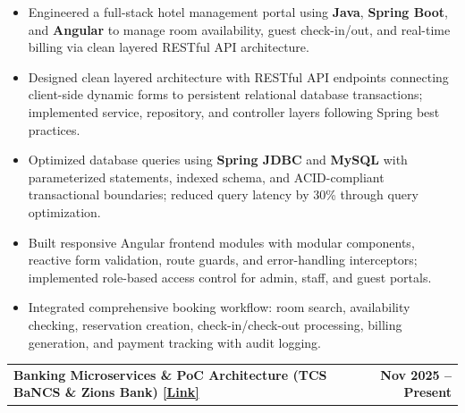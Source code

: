 \documentclass[10pt,a4paper]{article}
\makeatletter
\newcommand{\entry}[2]{%
    \noindent
    \begin{tabularx}{\linewidth}{@{}X r@{}}
        \textbf{#1} & \textbf{#2}
    \end{tabularx}
    \vspace{-2pt}
}
\makeatother
\begin{document}
\begin{itemize}

\item Engineered a full-stack hotel management portal using \textbf{Java}, \textbf{Spring Boot}, and \textbf{Angular} to manage room availability, guest check-in/out, and real-time billing via clean layered RESTful API architecture.

\item Designed clean layered architecture with RESTful API endpoints connecting client-side dynamic forms to persistent relational database transactions; implemented service, repository, and controller layers following Spring best practices.

\item Optimized database queries using \textbf{Spring JDBC} and \textbf{MySQL} with parameterized statements, indexed schema, and ACID-compliant transactional boundaries; reduced query latency by 30\% through query optimization.

\item Built responsive Angular frontend modules with modular components, reactive form validation, route guards, and error-handling interceptors; implemented role-based access control for admin, staff, and guest portals.

\item Integrated comprehensive booking workflow: room search, availability checking, reservation creation, check-in/check-out processing, billing generation, and payment tracking with audit logging.

\end{itemize}

\vspace{1pt}

\entry
{Banking Microservices \& PoC Architecture (TCS BaNCS \& Zions Bank)
\hspace{2pt}
\href{https://github.com/marideharshith21}
{\textcolor{linkblue}{[Link]}}}
{Nov 2025 -- Present}
\end{document}
